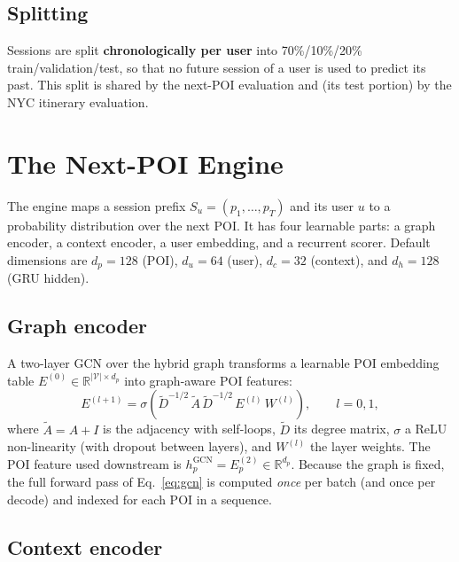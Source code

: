 \subsection{Splitting}
\label{sec:sol-data-split}

Sessions are split \textbf{chronologically per user} into 70\%/10\%/20\% train/validation/test,
so that no future session of a user is used to predict its past. This split is shared by the
next-POI evaluation and (its test portion) by the NYC itinerary evaluation.

\section{The Next-POI Engine}
\label{sec:sol-model}

The engine maps a session prefix $S_u=(p_1,\dots,p_T)$ and its user $u$ to a probability
distribution over the next POI. It has four learnable parts: a graph encoder, a context
encoder, a user embedding, and a recurrent scorer. Default dimensions are
$d_p\!=\!128$ (POI), $d_u\!=\!64$ (user), $d_c\!=\!32$ (context), and $d_h\!=\!128$ (GRU hidden).

\subsection{Graph encoder}
\label{sec:sol-model-gcn}

A two-layer GCN over the hybrid graph transforms a learnable POI embedding table
$E^{(0)}\in\mathbb{R}^{|\mathcal{V}|\times d_p}$ into graph-aware POI features:
\begin{equation}
  E^{(l+1)} = \sigma\!\left(\tilde{D}^{-1/2}\,\tilde{A}\,\tilde{D}^{-1/2}\,E^{(l)}\,W^{(l)}\right),
  \qquad l = 0,1,
  \label{eq:gcn}
\end{equation}
where $\tilde{A}=A+I$ is the adjacency with self-loops, $\tilde{D}$ its degree matrix,
$\sigma$ a ReLU non-linearity (with dropout between layers), and $W^{(l)}$ the layer weights.
The POI feature used downstream is $h_p^{\mathrm{GCN}}=E^{(2)}_p\in\mathbb{R}^{d_p}$. Because the
graph is fixed, the full forward pass of Eq.~\eqref{eq:gcn} is computed \emph{once} per batch
(and once per decode) and indexed for each POI in a sequence.

\subsection{Context encoder}
\label{sec:sol-model-context}

